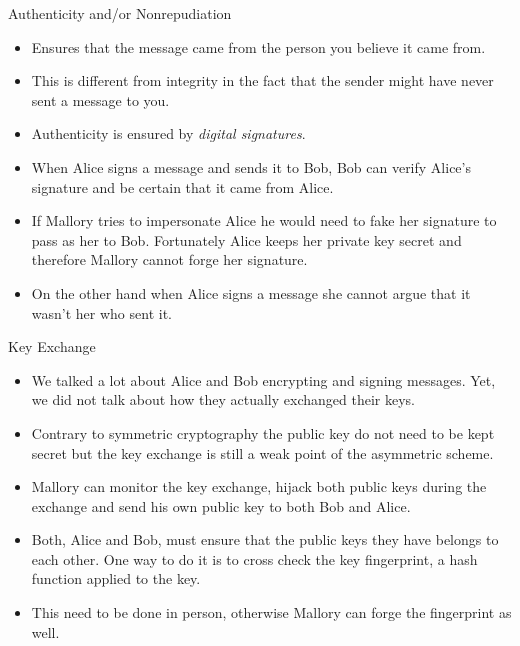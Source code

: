 \documentclass[hyperref={colorlinks=true}]{beamer}
\begin{document}
\begin{frame}{Authenticity and/or Nonrepudiation}
  \begin{itemize}
    \item Ensures that the message came from the person you believe it came
from.
    \item This is different from integrity in the fact that the sender might
have never sent a message to you.
    \item Authenticity is ensured by \emph{digital signatures}.
    \item When Alice signs a message and sends it to Bob, Bob can verify
Alice's signature and be certain that it came from Alice.
    \item If Mallory tries to impersonate Alice he would need to fake her
signature to pass as her to Bob.  Fortunately Alice keeps her private key
secret and therefore Mallory cannot forge her signature.
    \item On the other hand when Alice signs a message she cannot argue that it
wasn't her who sent it.
  \end{itemize}
\end{frame}

\begin{frame}{Key Exchange}
  \begin{itemize}
    \item We talked a lot about Alice and Bob encrypting and signing messages.
Yet, we did not talk about how they actually exchanged their keys.
    \item Contrary to symmetric cryptography the public key do not need to be
kept secret but the key exchange is still a weak point of the asymmetric
scheme.
    \item Mallory can monitor the key exchange, hijack both public keys during
the exchange and send his own public key to both Bob and Alice.
    \item Both, Alice and Bob, must ensure that the public keys they have
belongs to each other.  One way to do it is to cross check the key fingerprint,
a hash function applied to the key.
    \item This need to be done in person, otherwise Mallory can forge the
fingerprint as well.
  \end{itemize}
\end{frame}
\end{document}

